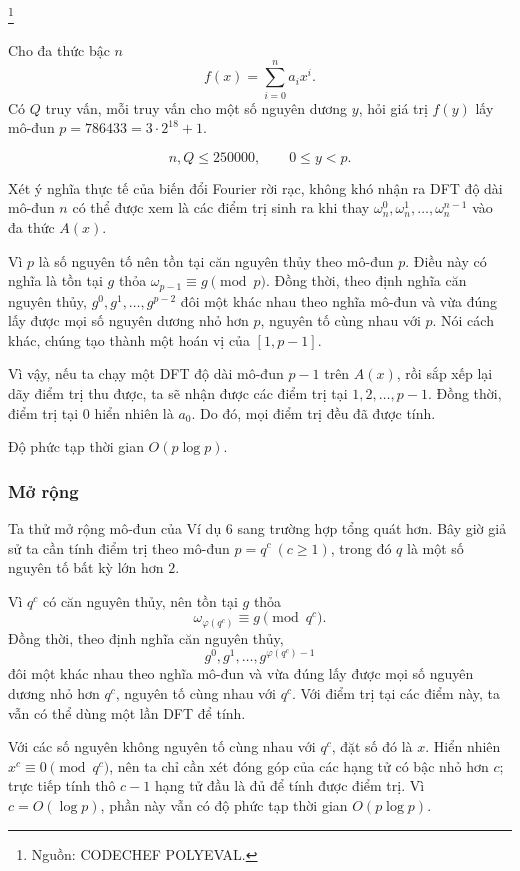 \documentclass[11pt]{article}
\begin{document}
\paragraph{}\footnote{Nguồn: CODECHEF POLYEVAL.}

 Cho đa thức bậc \(n\)
\[
f(x)=\sum_{i=0}^{n}a_i x^i.
\]
Có \(Q\) truy vấn, mỗi truy vấn cho một số nguyên dương \(y\), hỏi giá trị
\(f(y)\) lấy mô-đun \(p=786433=3\cdot 2^{18}+1\).

\[
n,Q\le 250000,\qquad 0\le y<p.
\]

 Xét ý nghĩa thực tế của biến đổi Fourier rời rạc, không khó
nhận ra DFT độ dài mô-đun \(n\) có thể được xem là các điểm trị sinh ra khi
thay \(\omega_n^0,\omega_n^1,\ldots,\omega_n^{n-1}\) vào đa thức \(A(x)\).

Vì \(p\) là số nguyên tố nên tồn tại căn nguyên thủy theo mô-đun \(p\). Điều
này có nghĩa là tồn tại \(g\) thỏa \(\omega_{p-1}\equiv g\pmod p\). Đồng thời,
theo định nghĩa căn nguyên thủy, \(g^0,g^1,\ldots,g^{p-2}\) đôi một khác nhau
theo nghĩa mô-đun và vừa đúng lấy được mọi số nguyên dương nhỏ hơn \(p\), nguyên
tố cùng nhau với \(p\). Nói cách khác, chúng tạo thành một hoán vị của
\([1,p-1]\).

Vì vậy, nếu ta chạy một DFT độ dài mô-đun \(p-1\) trên \(A(x)\), rồi sắp xếp
lại dãy điểm trị thu được, ta sẽ nhận được các điểm trị tại
\(1,2,\ldots,p-1\). Đồng thời, điểm trị tại \(0\) hiển nhiên là \(a_0\). Do đó,
mọi điểm trị đều đã được tính.

Độ phức tạp thời gian \(O(p\log p)\).

\subsubsection{Mở rộng}

Ta thử mở rộng mô-đun của Ví dụ 6 sang trường hợp tổng quát hơn. Bây giờ giả
sử ta cần tính điểm trị theo mô-đun \(p=q^c\ (c\ge 1)\), trong đó \(q\) là một
số nguyên tố bất kỳ lớn hơn \(2\).

Vì \(q^c\) có căn nguyên thủy, nên tồn tại \(g\) thỏa
\[
\omega_{\varphi(q^c)}\equiv g\pmod {q^c}.
\]
Đồng thời, theo định nghĩa căn nguyên thủy,
\[
g^0,g^1,\ldots,g^{\varphi(q^c)-1}
\]
đôi một khác nhau theo nghĩa mô-đun và vừa đúng lấy được mọi số nguyên dương
nhỏ hơn \(q^c\), nguyên tố cùng nhau với \(q^c\). Với điểm trị tại các điểm này,
ta vẫn có thể dùng một lần DFT để tính.

Với các số nguyên không nguyên tố cùng nhau với \(q^c\), đặt số đó là \(x\).
Hiển nhiên \(x^c\equiv 0\pmod {q^c}\), nên ta chỉ cần xét đóng góp của các hạng
tử có bậc nhỏ hơn \(c\); trực tiếp tính thô \(c-1\) hạng tử đầu là đủ để tính
được điểm trị. Vì \(c=O(\log p)\), phần này vẫn có độ phức tạp thời gian
\(O(p\log p)\).
\end{document}
